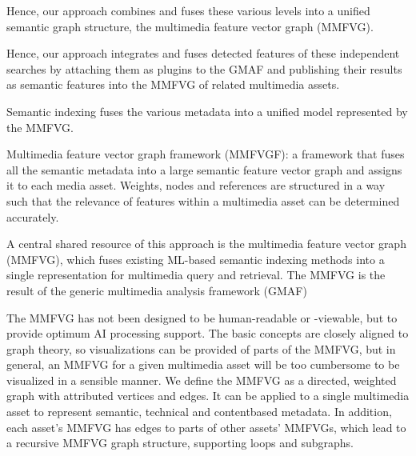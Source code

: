 Hence, our approach combines and fuses these
various levels into a unified semantic graph structure, the multimedia feature vector
graph (MMFVG).

Hence, our approach
integrates and fuses detected features of these independent searches by attaching them as
plugins to the GMAF and publishing their results as semantic features into the MMFVG of
related multimedia assets.

Semantic indexing
fuses the various metadata into a unified model represented by the MMFVG.

Multimedia feature vector graph framework (MMFVGF): a framework that fuses all
the semantic metadata into a large semantic feature vector graph and assigns it to
each media asset. Weights, nodes and references are structured in a way such that the
relevance of features within a multimedia asset can be determined accurately.

A central shared resource of this approach is the multimedia feature vector graph
(MMFVG), which fuses existing ML-based semantic indexing methods into a single representation
for multimedia query and retrieval. The MMFVG is the result of the generic
multimedia analysis framework (GMAF)

The MMFVG has not been designed to be human-readable or -viewable, but to provide
optimum AI processing support. The basic concepts are closely aligned to graph theory, so
visualizations can be provided of parts of the MMFVG, but in general, an MMFVG for a
given multimedia asset will be too cumbersome to be visualized in a sensible manner. We
define the MMFVG as a directed, weighted graph with attributed vertices and edges. It
can be applied to a single multimedia asset to represent semantic, technical and contentbased
metadata. In addition, each asset’s MMFVG has edges to parts of other assets’
MMFVGs, which lead to a recursive MMFVG graph structure, supporting loops and
subgraphs.

